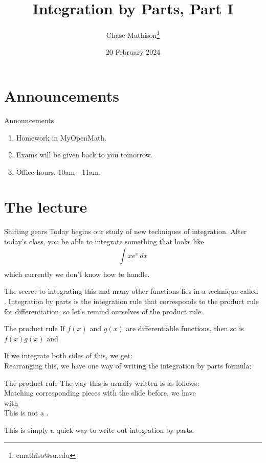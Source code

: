 \documentclass[presentation]{beamer}
\institute[SU]{Shenandoah University}
\author{Chase Mathison\thanks{cmathiso@su.edu}}
\date{20 February 2024}
\title{Integration by Parts, Part I}
\begin{document}
\maketitle
\section{Announcements}
\label{sec:org3f9dd8c}
\begin{frame}[label={sec:org0c73c46}]{Announcements}
\begin{enumerate}
\item Homework in MyOpenMath.
\item Exams will be given back to you tomorrow.
\item Office hours, 10am - 11am.
\end{enumerate}
\end{frame}

\section{The lecture}
\label{sec:org3d16c63}
\begin{frame}[label={sec:org0b7e201}]{Shifting gears}
Today begins our study of new techniques of integration.  After
today's class, you be able to integrate something that looks like
\[
\int\limits_{}^{} xe^x\,dx \]
which currently we don't know how to handle.

The secret to integrating this and many other functions lies in a
technique called \uline{\hspace{1in}}.  
Integration by parts is the integration rule that corresponds to the
product rule for differentiation, so let's remind ourselves of the
product rule. 
\end{frame}

\begin{frame}[label={sec:org0e0b4d4}]{The product rule}
If \(f \left( x \right)\) and \(g \left( x \right)\) are
differentiable functions, then so is \(f \left( x \right)g \left( x
\right)\) and
\[
\hspace{1in} \]

If we integrate both sides of this, we get:
\[
\hspace{1in}\]
Rearranging this, we have one way of writing the integration by parts
formula:
\[
\hspace{1in}\]
\end{frame}

\begin{frame}[label={sec:orgccdb46f}]{The product rule}
The way this is usually written is as follows:
\[
\hspace{1in} \]
Matching corresponding pieces with the slide before, we have
\[
\hspace{1in}\]
with
\[
\hspace{1in} \]
This is not a \uline{\hspace{1in}}.

This is simply a quick way to write out integration by parts.
\end{frame}
\end{document}
